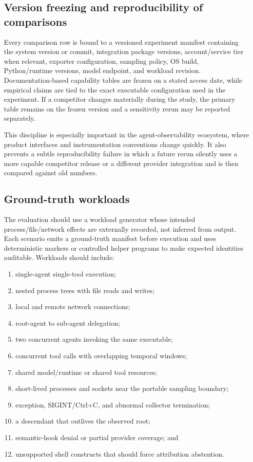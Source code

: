 \subsection{Version freezing and reproducibility of comparisons}
Every comparison row is bound to a versioned experiment manifest containing the system version or commit, integration package versions, account/service tier when relevant, exporter configuration, sampling policy, OS build, Python/runtime versions, model endpoint, and workload revision. Documentation-based capability tables are frozen on a stated access date, while empirical claims are tied to the exact executable configuration used in the experiment. If a competitor changes materially during the study, the primary table remains on the frozen version and a sensitivity rerun may be reported separately.

This discipline is especially important in the agent-observability ecosystem, where product interfaces and instrumentation conventions change quickly. It also prevents a subtle reproducibility failure in which a future rerun silently uses a more capable competitor release or a different provider integration and is then compared against old numbers.

\subsection{Ground-truth workloads}
The evaluation should use a workload generator whose intended process/file/network effects are externally recorded, not inferred from \system output. Each scenario emits a ground-truth manifest before execution and uses deterministic markers or controlled helper programs to make expected identities auditable. Workloads should include:
\begin{enumerate}
  \item single-agent single-tool execution;
  \item nested process trees with file reads and writes;
  \item local and remote network connections;
  \item root-agent to sub-agent delegation;
  \item two concurrent agents invoking the same executable;
  \item concurrent tool calls with overlapping temporal windows;
  \item shared model/runtime or shared tool resources;
  \item short-lived processes and sockets near the portable sampling boundary;
  \item exception, SIGINT/Ctrl+C, and abnormal collector termination;
  \item a descendant that outlives the observed root;
  \item semantic-hook denial or partial provider coverage; and
  \item unsupported shell constructs that should force attribution abstention.
\end{enumerate}

